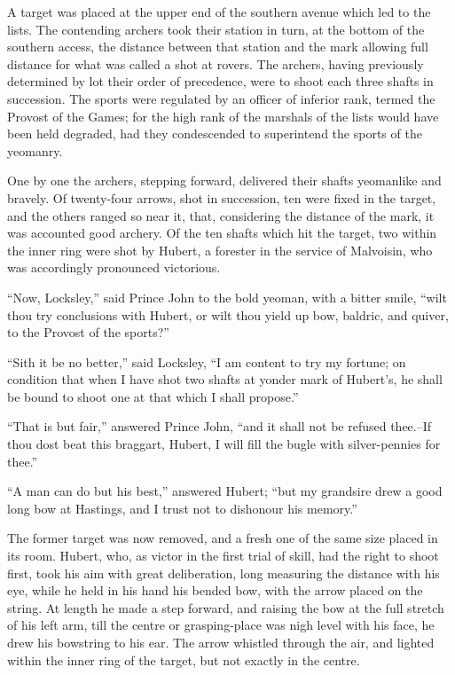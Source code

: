 A target was placed at the upper end of the southern avenue which led to
the lists. The contending archers took their station in turn, at the
bottom of the southern access, the distance between that station and the
mark allowing full distance for what was called a shot at rovers. The
archers, having previously determined by lot their order of precedence,
were to shoot each three shafts in succession. The sports were regulated
by an officer of inferior rank, termed the Provost of the Games; for the
high rank of the marshals of the lists would have been held degraded,
had they condescended to superintend the sports of the yeomanry.

One by one the archers, stepping forward, delivered their shafts
yeomanlike and bravely. Of twenty-four arrows, shot in succession, ten
were fixed in the target, and the others ranged so near it, that,
considering the distance of the mark, it was accounted good archery. Of
the ten shafts which hit the target, two within the inner ring were shot
by Hubert, a forester in the service of Malvoisin, who was accordingly
pronounced victorious.

``Now, Locksley,'' said Prince John to the bold yeoman, with a bitter
smile, ``wilt thou try conclusions with Hubert, or wilt thou yield up
bow, baldric, and quiver, to the Provost of the sports?''

``Sith it be no better,'' said Locksley, ``I am content to try my
fortune; on condition that when I have shot two shafts at yonder mark of
Hubert's, he shall be bound to shoot one at that which I shall
propose.''

``That is but fair,'' answered Prince John, ``and it shall not be
refused thee.--If thou dost beat this braggart, Hubert, I will fill the
bugle with silver-pennies for thee.''

``A man can do but his best,'' answered Hubert; ``but my grandsire drew
a good long bow at Hastings, and I trust not to dishonour his memory.''

The former target was now removed, and a fresh one of the same size
placed in its room. Hubert, who, as victor in the first trial of skill,
had the right to shoot first, took his aim with great deliberation, long
measuring the distance with his eye, while he held in his hand his
bended bow, with the arrow placed on the string. At length he made a
step forward, and raising the bow at the full stretch of his left arm,
till the centre or grasping-place was nigh level with his face, he drew
his bowstring to his ear. The arrow whistled through the air, and
lighted within the inner ring of the target, but not exactly in the
centre.

